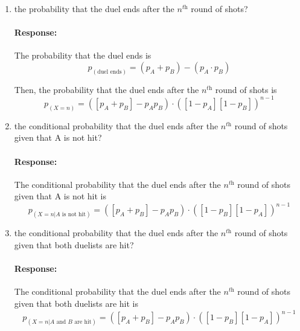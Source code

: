 \documentclass [11pt] {article}
\newenvironment{response}{\begin{responseframe}\vspace{-10pt}\paragraph{Response:}}{\end{responseframe}}
\renewcommand{\it}[1]{\textit{{#1}}}
\begin{document}
\begin{enumerate}
\begin{enumerate}
\begin{enumerate}[itemsep=10pt]
                    \item the probability that the duel ends after the $n^{\it{th}}$ round of shots?
                        \begin{response}
                            The probability that the duel ends is
                            \vspace{-5pt}
                            \[p_{(\text{duel ends})} = (p_A + p_B) - \left( p_A \cdot p_B \right)\]
                            \vspace{-15pt}

                            Then, the probability that the duel ends after the $n^{\it{th}}$ round of 
                            shots is 
                            \vspace{-5pt}
                            \[p_{(X = n)} = ([p_A + p_B] - p_A p_B) \cdot \left([1 - p_A] [1 - p_B] \right)^{n - 1}\]
                        \end{response}

                    \item the conditional probability that the duel ends after the $n^{\it{th}}$ 
                        round of shots given that A is not hit?
                        \begin{response}
                            The conditional probability that the duel ends after the $n^{\it{th}}$ 
                            round of shots given that A is not hit is
                            \vspace{-5pt}
                            \[p_{(X = n | A \text{ is not hit})} = ([p_A + p_B] - p_A p_B) \cdot \left( \left[ 1 - p_B \right] \left[ 1 - p_A \right] \right)^{n - 1}\]
                        \end{response}

                        \newpage
                    \item the conditional probability that the duel ends after the $n^{\it{th}}$ 
                        round of shots given that both duelists are hit?
                        \begin{response}
                            The conditional probability that the duel ends after the $n^{\it{th}}$ 
                            round of shots given that both duelists are hit is
                            \vspace{-5pt}
                            \[p_{(X = n | A \text{ and } B \text{ are hit})} = ([p_A + p_B] - p_A p_B) \cdot \left( \left[ 1 - p_B \right] \left[ 1 - p_A \right] \right)^{n - 1}\]
                        \end{response}
                \end{enumerate}


\end{enumerate}
\end{enumerate}
\end{document}
